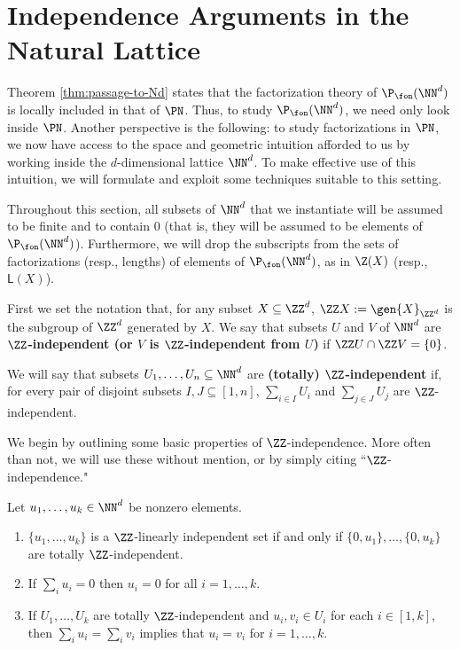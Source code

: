 \section{Independence Arguments in the Natural Lattice}

Theorem \ref{thm:passage-to-Nd} states that the factorization theory of $\P_\fon(\NN^d)$ is locally included in that of $\PN$.
Thus, to study $\P_\fon(\NN^d)$, we need only look inside $\PN$. 
Another perspective is the following: to study factorizations in $\PN$, we now have access to the space and geometric intuition afforded to us by working inside the $d$-dimensional lattice $\NN^d$.
To make effective use of this intuition, we will formulate and exploit some techniques suitable to this setting.

Throughout this section, all subsets of $\NN^d$ that we instantiate will be assumed to be finite and to contain $0$ (that is, they will be assumed to be elements of $\P_\fon(\NN^d)$).
Furthermore, we will drop the subscripts from the sets of factorizations (resp., lengths) of elements of $\P_\fon(\NN^d)$, as in $\Z(X)$ (resp., $\mathsf{L}(X)$).

\begin{defn}
First we set the notation that, for any subset $X \subseteq \ZZ^d$, $\ZZ X := \gen{X}_{\ZZ^d}$ is the subgroup of $\ZZ^d$ generated by $X$.
We say that subsets $U$ and $V$ of $\NN^d$ are \textbf{$\ZZ$-independent (or $V$ is $\ZZ$-independent from $U$)} if $\ZZ U \cap \ZZ V = \{0\}$.

We will say that subsets $U_1,\dots, U_n\subseteq \NN^d$ are \textbf{(totally) $\ZZ$-independent} if, for every pair of disjoint subsets $I,J\subseteq[ 1,n ]$, $\sum_{i\in I} U_i$ and $\sum_{j\in J} U_j$ are $\ZZ$-independent.
\end{defn}

We begin by outlining some basic properties of $\ZZ$-independence.  
More often than not, we will use these without mention, or by simply citing ``$\ZZ$-independence."
\begin{prop} \label{prop:eltwise-indep}
Let $u_1,\dots, u_k\in \NN^d$ be nonzero elements.
\begin{enumerate}[label={\rm (\roman{*})}]
	\item $\{u_1,\dots,u_k\}$ is a $\ZZ$-linearly independent set if and only if $\{0,u_1\},\dots,\{0,u_k\}$ are totally $\ZZ$-independent.
	
	\item If $\sum_i u_i = 0$ then $u_i = 0$ for all $i=1,\dots, k$.
	
	\item If $U_1,\dots, U_k$ are totally $\ZZ$-independent and $u_i, v_i\in U_i$ for each $i\in [ 1,k ]$,
	then $\sum_i u_i = \sum_i v_i$ implies that $u_i = v_i$ for $i = 1,\dots, k$.
\end{enumerate}
\end{prop}


